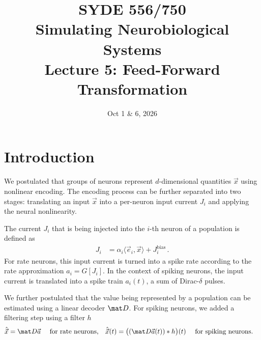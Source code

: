 \documentclass[10pt,letterpaper,oneside]{article}
\date{Oct 1 \& 6, 2026}
\title{SYDE 556/750 \\ Simulating Neurobiological Systems \\ Lecture 5: Feed-Forward Transformation}
\begin{document}
	
	
	\section{Introduction}
	
	
	We postulated that groups of neurons represent $d$-dimensional quantities $\vec x$ using nonlinear encoding. The encoding process can be further separated into two stages: translating an input $\vec x$ into a per-neuron input current $J_i$ and applying the neural nonlinearity.
	
	The current $J_i$ that is being injected into the $i$-th neuron of a population is defined as
	\begin{align}
	J_i &= \alpha_i \langle \vec e_i, \vec x \rangle + J^\mathrm{bias}_i \,.
	\label{eqn:current}
	\end{align}
	For rate neurons, this input current is turned into a spike rate according to the rate approximation $a_i = G[J_i]$. In the context of spiking neurons, the input current is translated into a spike train $a_i(t)$, a sum of Dirac-$\delta$ pulses.
	
	We further postulated that the value being represented by a population can be estimated using a linear decoder $\mat D$. For spiking neurons, we added a filtering step using a filter $h$
	\begin{align}
	\hat{\vec x} &= \mat D \vec a \quad \text{ for rate neurons,} & 
	\hat{\vec x}(t) &= \big( (\mat D \vec a(t)) \ast h \big)(t) \quad \text{ for spiking neurons.}
	\label{eqn:decoding}
	\end{align}
	
\end{document}
